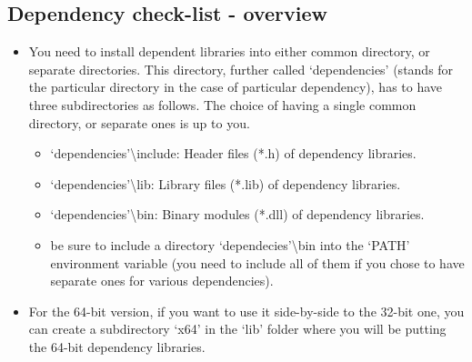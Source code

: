 \documentclass[a4paper,0pt,english]{sphinxmanual}
\begin{document}
\subsection{Dependency check-list - overview}
\label{src/installation/win:dependency-check-list-overview}\begin{itemize}
\item {} 
You need to install dependent libraries into either common directory, or separate directories. This directory, further called `dependencies' (stands for the particular directory in the case of particular dependency), has to have three subdirectories as follows. The choice of having a single common directory, or separate ones is up to you.
\begin{itemize}
\item {} 
`dependencies'\textbackslash{}include: Header files (*.h) of dependency libraries.

\item {} 
`dependencies'\textbackslash{}lib: Library files (*.lib) of dependency libraries.

\item {} 
`dependencies'\textbackslash{}bin: Binary modules (*.dll) of dependency libraries.

\item {} 
be sure to include a directory `dependecies'\textbackslash{}bin into the `PATH' environment variable (you need to include all of them if you chose to have separate ones for various dependencies).

\end{itemize}

\item {} 
For the 64-bit version, if you want to use it side-by-side to the 32-bit one, you can create a subdirectory `x64' in the `lib' folder where you will be putting the 64-bit dependency libraries.

\end{itemize}
\end{document}

